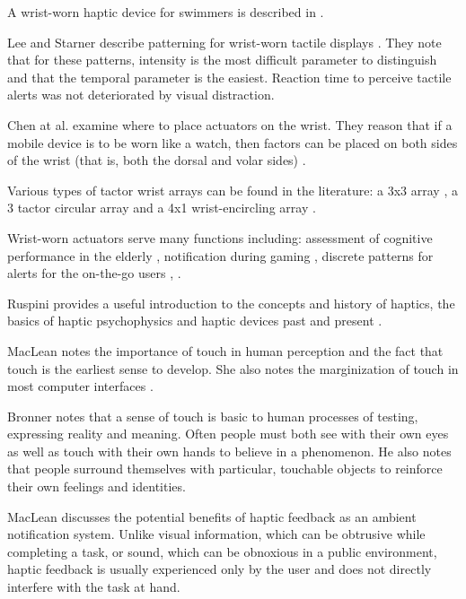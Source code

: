 \documentclass{chi-ext}
\begin{document}
A wrist-worn haptic device for swimmers is described in \cite{forster2009non}.

Lee and Starner describe patterning for wrist-worn tactile displays \cite{lee2010buzzwear}. They note that for these patterns, intensity is the most difficult parameter to distinguish and that the temporal parameter is the easiest. Reaction time to perceive tactile alerts was not deteriorated by visual distraction. 

Chen at al. examine where to place actuators on the wrist. They reason that if a mobile device is to be worn like a watch, then factors can be placed on both sides of the wrist (that is, both the dorsal and volar sides) \cite{chen2008tactor}. 

Various types of tactor wrist arrays can be found in the literature:  a 3x3 array \cite{chen2008tactor}, a 3 tactor circular array \cite{lee2010buzzwear} and a 4x1 wrist-encircling array \cite{matscheko2010tactor}.

Wrist-worn actuators serve many functions including: 
assessment of cognitive performance in the elderly \cite{ivorra2008minimally},
notification during gaming \cite{martins2008gauntlet},
discrete patterns for alerts for the on-the-go users \cite{lee2010buzzwear}, \cite{chen2008tactor}. 

Ruspini provides a useful introduction to the concepts and history of haptics, the basics of haptic psychophysics and haptic devices past and present \cite{ruspini1999haptics}.

MacLean notes the importance of touch in human perception and the fact that touch is the earliest sense to develop. She also notes the marginization of touch in most computer interfaces \cite{maclean2008haptic}. 

Bronner notes that a sense of touch is basic to human processes of testing, expressing reality and meaning. Often people must both see with their own eyes as well as touch with their own hands to believe in a phenomenon\cite{bronner1982haptic}. He also notes that people surround themselves with particular, touchable objects to reinforce their own feelings and identities. 

MacLean \cite{maclean2009putting} discusses the potential benefits of haptic feedback as an ambient notification system. Unlike visual information, which can be obtrusive while completing a task, or sound, which can be obnoxious in a public environment, haptic feedback is usually experienced only by the user and does not directly interfere with the task at hand. 
\end{document}
